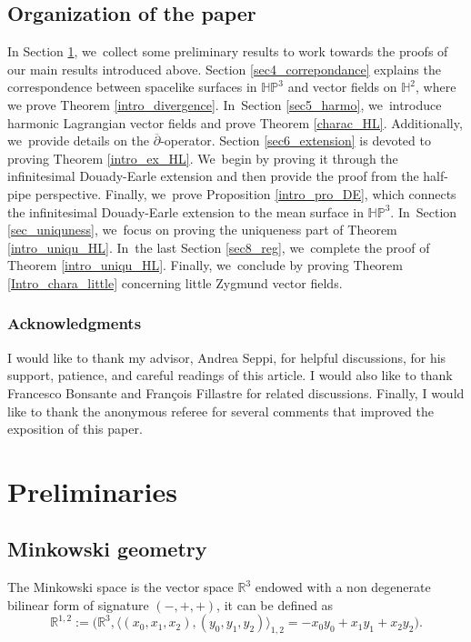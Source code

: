 \documentclass[JEP,XML,SOM,Unicode,NoEqCountersInSection, NoFloatCountersInSection,published]{cedram}
\theoremstyle{plain}
\theoremstyle{definition}
\newcommand{\minko}{\mathbb{R}^{1,2}}
\newcommand{\HP}{\mathbb{HP}^3}
\newcommand{\inner}[1] {\langle #1 \rangle}
\begin{document}
\subsection{Organization of the paper}
In Section \ref{section3}, we~collect some preliminary results to work towards the proofs of our main results introduced above. Section \ref{sec4_correpondance} explains the correspondence between spacelike surfaces in \(\HP \) and vector fields on \(\mathbb{H}^2 \), where we prove Theorem \ref{intro_divergence}. In~Section \ref{sec5_harmo}, we~introduce harmonic Lagrangian vector fields and prove Theorem \ref{charac_HL}. Additionally, we~provide details on the \(\overline{\partial}\)-operator. Section \ref{sec6_extension} is devoted to proving Theorem \ref{intro_ex_HL}. We~begin by proving it through the infinitesimal Douady-Earle extension and then provide the proof from the half-pipe perspective. Finally, we~prove Proposition \ref{intro_pro_DE}, which connects the infinitesimal Douady-Earle extension to the mean surface in \(\HP \). In~Section \ref{sec_uniquness}, we~focus on proving the uniqueness part of Theorem \ref{intro_uniqu_HL}. In~the last Section \ref{sec8_reg}, we~complete the proof of Theorem \ref{intro_uniqu_HL}. Finally, we~conclude by proving Theorem \ref{Intro_chara_little} concerning little Zygmund vector fields.

\subsubsection*{Acknowledgments}

I would like to thank my advisor, Andrea Seppi, for helpful discussions, for his support, patience, and careful readings of this article. I would also like to thank Francesco Bonsante and François Fillastre for related discussions. Finally, I would like to thank the anonymous referee for several comments
that improved the exposition of this paper.


\section{Preliminaries}\label{section3}
\subsection{Minkowski geometry}
The Minkowski space is the vector space $\mathbb{R}^3$ endowed with a non degenerate bilinear form of signature $(-,+,+)$, it can be defined as
\[
\minko:=\bigl(\mathbb{R}^3, \inner{(x_0,x_1,x_2),(y_0,y_1,y_2)}_{1,2}=-x_0y_0+x_1y_1+x_2y_2\bigr).
\]
\end{document}
